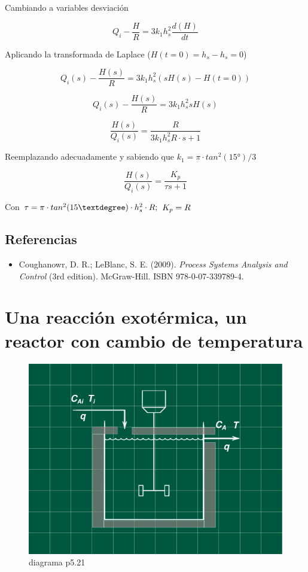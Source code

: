 \documentclass[
  letterpaper,
  DIV=11,
  numbers=noendperiod]{scrreprt}
\providecommand{\tightlist}{%
  \setlength{\itemsep}{0pt}\setlength{\parskip}{0pt}}\usepackage{longtable,booktabs,array}
\begin{document}
Cambiando a variables desviación

\[
Q_i-\frac{H}{R}=3k_1h_s^2\frac{d(H)}{dt}
\]

Aplicando la transformada de Laplace (\(H(t=0) = h_s-h_s = 0\))

\[
Q_i(s)-\frac{H(s)}{R}=3k_1h_s^2(sH(s)-H(t=0))
\]

\[
Q_i(s)-\frac{H(s)}{R}=3k_1h_s^2sH(s)
\]

\[
\frac{H(s)}{Q_i(s)}=\frac{R}{3k_1h_s^2R\cdot s+1}
\]

Reemplazando adecuadamente y sabiendo que \(k_1=\pi \cdot tan^2(15°)/3\)

\[
\frac{H(s)}{Q_i(s)}=\frac{K_p}{\tau s+1}
\]

Con \(\tau =\pi \cdot tan^2(15°)\cdot h_s^2\cdot R\space\space;\)
\(\space\space K_p = R\)

\hypertarget{referencias-9}{%
\section{Referencias}\label{referencias-9}}

\begin{itemize}
\tightlist
\item
  Coughanowr, D. R.; LeBlanc, S. E. (2009). \emph{Process Systems
  Analysis and Control} (3rd edition). McGraw-Hill. ISBN
  978-0-07-339789-4.
\end{itemize}

\hypertarget{una-reacciuxf3n-exotuxe9rmica-un-reactor-con-cambio-de-temperatura}{%
\chapter{Una reacción exotérmica, un reactor con cambio de
temperatura}\label{una-reacciuxf3n-exotuxe9rmica-un-reactor-con-cambio-de-temperatura}}

\begin{figure}

{\centering \includegraphics{././images/p5.21-seborg/headercontrol521.png}

}

\caption{diagrama p5.21}

\end{figure}
\end{document}
